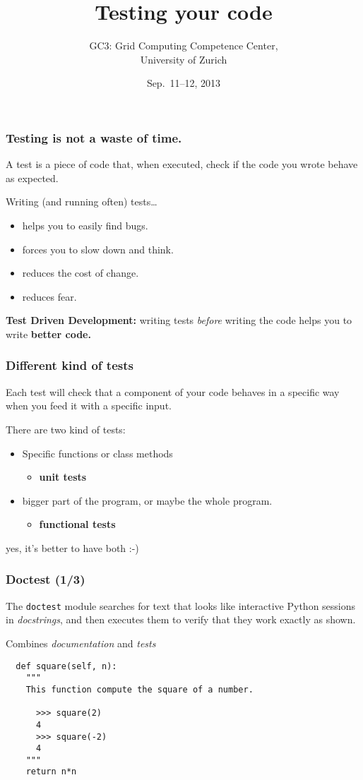 \documentclass[english,serif,mathserif,xcolor=pdftex,dvipsnames,table]{beamer}
\title[Testing]{%
  Testing your code
}
\author[GC3]{%
  GC3: Grid Computing Competence Center, \\
  University of Zurich
}
\date{Sep.~11--12, 2013}
\begin{document}
\maketitle


\begin{frame}
  \frametitle{Testing is \textbf{not} a waste of time.}
  A test is a piece of code that, when executed, check if the code you
  wrote behave as expected.

  \+
  Writing (and running often) tests\ldots
  \begin{itemize}
  \item helps you to easily find bugs.
  \item forces you to slow down and think.
  \item reduces the cost of change.
  \item reduces fear.
  \end{itemize}

  \+ \textbf{Test Driven Development:} writing tests \textit{before}
  writing the code helps you to write \textbf{better code.}
\end{frame}


\begin{frame}
  \frametitle{Different kind of tests}

  Each test will check that a component of your code behaves in a
  specific way when you feed it with a specific input.

  \+
  There are two kind of tests:
  \begin{itemize}
  \item Specific functions or class methods
    \begin{itemize}
    \item \textbf{unit tests}
    \end{itemize}
  \item bigger part of the program, or maybe the whole program.
    \begin{itemize}
    \item \textbf{functional tests}
    \end{itemize}
  \end{itemize}

  \+
  \pause
  yes, it's better to have both :-)
\end{frame}


\begin{frame}[fragile]
  \frametitle{Doctest (1/3)}

  The \lstinline|doctest| module searches for text that looks like
  interactive Python sessions in \textit{docstrings}, and then
  executes them to verify that they work exactly as shown.

  \+
  Combines \textit{documentation} and \textit{tests}
  \begin{lstlisting}
  def square(self, n):
    """
    This function compute the square of a number.

      >>> square(2)
      4
      >>> square(-2)
      4
    """
    return n*n
  \end{lstlisting}
\end{frame}
\end{document}
